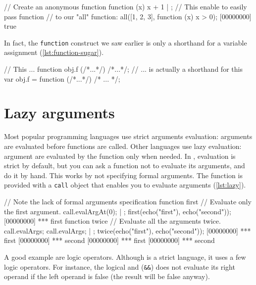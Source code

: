\documentclass[openright,twoside,12pt]{report}
\begin{document}
\begin{urbiscript}[caption=Lambda function, label=lst:lambda, name=all]
// Create an anonymous function
function (x) {x + 1} | {};
// This enable to easily pass function
// to our "all" function:
all([1, 2, 3], function (x) { x > 0});
[00000000] true
\end{urbiscript}

In fact, the \texttt{function} construct we saw earlier is only a
shorthand for a variable assignment (\autoref{lst:function-sugar}).

\begin{urbiscript}[caption=The function sugar,
label=lst:function-sugar]
// This ...
function obj.f (/*...*/) {/*...*/};
// ... is actually a shorthand for this
var obj.f = function (/*...*/) {/* ... */};
\end{urbiscript}

\section{Lazy arguments}

Most popular programming languages use strict arguments evaluation:
arguments are evaluated before functions are called. Other languages
use lazy evaluation: argument are evaluated by the function only when
needed. In \urbi, evaluation is strict by default, but you can ask a
function not to evaluate its arguments, and do it by hand. This works
by not specifying formal arguments. The function is provided with a
\texttt{call} object that enables you to evaluate arguments
(\autoref{lst:lazy}).

\begin{urbiscript}[caption=Tweaking arguments evaluation,
  label=lst:lazy]
// Note the lack of formal arguments specification
function first
{
  // Evaluate only the first argument.
  call.evalArgAt(0);
} | {};
first(echo("first"), echo("second"));
[00000000] *** first
function twice
{
  // Evaluate all the arguments twice.
  call.evalArgs;
  call.evalArgs;
} | {};
twice(echo("first"), echo("second"));
[00000000] *** first
[00000000] *** second
[00000000] *** first
[00000000] *** second
\end{urbiscript}

A good example are logic operators. Although \Cxx is a strict
language, it uses a few logic operators. For instance, the logical and
(\texttt{\&\&}) does not evaluate its right operand if the left
operand is false (the result will be false anyway).
\end{document}
